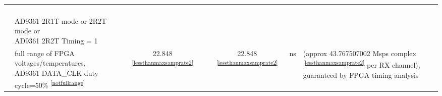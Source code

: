 \documentclass{article}
\begin{document}
\begin{landscape}
\begin{scriptsize}
\begin{longtable}{|c|l|c|c|c|c|l|}
                          &                                      &                                & &                                &                      & \\
                          &                                      &                                & &                                &                      & \\
                          &                                      &                                & &                                &                      & \\
                          &                                      &                                & &                                &                      & \\
                          & \multirow{2}{*}{\parbox{6.7 cm}{\hspace*{12mm}AD9361 2R1T mode or 2R2T mode or \\ \hspace*{12mm}AD9361 2R2T Timing = 1}} & & & & & \\
                          &                                      &                                & &                                &                      & \\
                          & \multirow{5}{*}{\parbox{6.7cm}{\hspace*{15mm}full range of FPGA voltages/temperatures,\\ \hspace*{15mm}AD9361 DATA\_CLK duty cycle=50\% \textsuperscript{\ref{notfullrange}} }} & \multirow{5}{*}{22.848 \textsuperscript{\ref{lessthanmaxsamprate2}}}  & & \multirow{5}{*}{22.848 \textsuperscript{\ref{lessthanmaxsamprate2}}} & \multirow{5}{*}{ns} & \multirow{5}{*}{\parbox{3.0cm}{(approx 43.767507002 Msps complex \textsuperscript{\ref{lessthanmaxsamprate2}} per RX channel), \\ guaranteed by FPGA timing analysis}} \\
                          &                                      &                                & &                                &                      & \\
                          &                                      &                                & &                                &                      & \\
                          &                                      &                                & &                                &                      & \\

\end{longtable}
\end{scriptsize}
\end{landscape}
\end{document}
